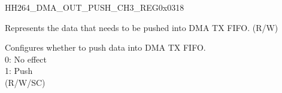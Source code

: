     \begin{register}{H}{H264\_DMA\_OUT\_PUSH\_CH3\_REG}{0x0318}\label{regdesc:H264DMAOUTPUSHCH3REG}
    \regnewline%
    \begin{regdesc}\begin{reglist}
    \label{fielddesc:H264DMAOUTFIFOWDATACH3}\item [H264\_DMA\_OUTFIFO\_WDATA\_CH3] Represents the data that needs to be pushed into DMA TX FIFO. (R/W)
    \label{fielddesc:H264DMAOUTFIFOPUSHCH3}\item [H264\_DMA\_OUTFIFO\_PUSH\_CH3] Configures whether to push data into DMA TX FIFO.\\
    0: No effect\\
    1: Push \\(R/W/SC)
    \end{reglist}\end{regdesc}
    \end{register}
    
